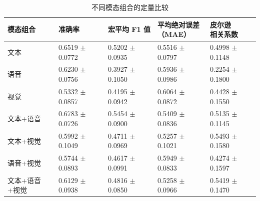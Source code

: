 \begin{table}[!htbp]
\centering
\caption{不同模态组合的定量比较}
\label{tab:q1_modality_ablation}
\setlength{\tabcolsep}{2pt}
\begin{tabular}{@{}p{3.3cm}*{4}{>{\centering\arraybackslash}p{3.0cm}}@{}}
\toprule
模态组合 & 准确率 & 宏平均 F1 值 & \shortstack{平均绝对误差\\（MAE）} & \shortstack{皮尔逊\\相关系数} \\
\midrule
文本 & \shortstack{0.6519\\$\pm$ 0.0772} & \shortstack{0.5202\\$\pm$ 0.0935} & \shortstack{0.5516\\$\pm$ 0.0797} & \shortstack{0.4998\\$\pm$ 0.1148} \\
语音 & \shortstack{0.6230\\$\pm$ 0.0756} & \shortstack{0.3927\\$\pm$ 0.1050} & \shortstack{0.5936\\$\pm$ 0.0986} & \shortstack{0.2254\\$\pm$ 0.1800} \\
视觉 & \shortstack{0.5332\\$\pm$ 0.0857} & \shortstack{0.4195\\$\pm$ 0.0942} & \shortstack{0.6064\\$\pm$ 0.0872} & \shortstack{0.4428\\$\pm$ 0.1550} \\
文本+语音 & \shortstack{0.6783\\$\pm$ 0.0726} & \shortstack{0.5454\\$\pm$ 0.0900} & \shortstack{0.5409\\$\pm$ 0.0836} & \shortstack{0.5135\\$\pm$ 0.1145} \\
文本+视觉 & \shortstack{0.5992\\$\pm$ 0.1049} & \shortstack{0.4711\\$\pm$ 0.0969} & \shortstack{0.5257\\$\pm$ 0.1021} & \shortstack{0.5493\\$\pm$ 0.1580} \\
语音+视觉 & \shortstack{0.5744\\$\pm$ 0.0893} & \shortstack{0.4617\\$\pm$ 0.0991} & \shortstack{0.5949\\$\pm$ 0.0833} & \shortstack{0.4274\\$\pm$ 0.1597} \\
文本+语音+视觉 & \shortstack{0.6129\\$\pm$ 0.0938} & \shortstack{0.4816\\$\pm$ 0.0850} & \shortstack{0.5258\\$\pm$ 0.0966} & \shortstack{0.5419\\$\pm$ 0.1470} \\
\bottomrule
\end{tabular}
\end{table}
